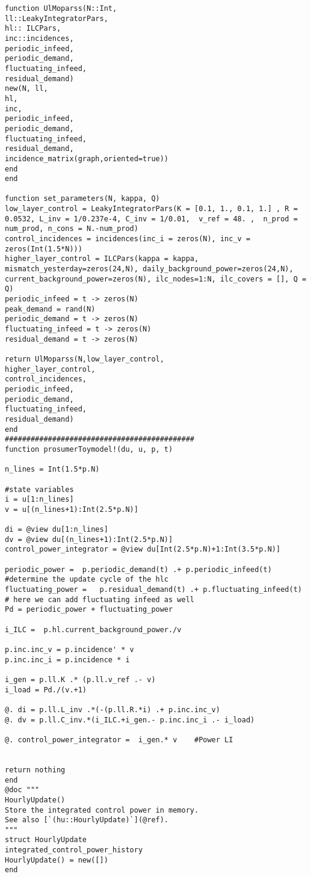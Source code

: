 \begin{lstlisting}
function UlMoparss(N::Int,
ll::LeakyIntegratorPars,
hl:: ILCPars,
inc::incidences,
periodic_infeed,
periodic_demand,
fluctuating_infeed,
residual_demand)
new(N, ll,
hl,
inc,
periodic_infeed,
periodic_demand,
fluctuating_infeed,
residual_demand,
incidence_matrix(graph,oriented=true))
end
end

function set_parameters(N, kappa, Q)
low_layer_control = LeakyIntegratorPars(K = [0.1, 1., 0.1, 1.] , R = 0.0532, L_inv = 1/0.237e-4, C_inv = 1/0.01,  v_ref = 48. ,  n_prod = num_prod, n_cons = N.-num_prod)
control_incidences = incidences(inc_i = zeros(N), inc_v = zeros(Int(1.5*N)))
higher_layer_control = ILCPars(kappa = kappa, mismatch_yesterday=zeros(24,N), daily_background_power=zeros(24,N), current_background_power=zeros(N), ilc_nodes=1:N, ilc_covers = [], Q = Q)
periodic_infeed = t -> zeros(N)
peak_demand = rand(N)
periodic_demand = t -> zeros(N)
fluctuating_infeed = t -> zeros(N)
residual_demand = t -> zeros(N)

return UlMoparss(N,low_layer_control,
higher_layer_control,
control_incidences,
periodic_infeed,
periodic_demand,
fluctuating_infeed,
residual_demand)
end
############################################
function prosumerToymodel!(du, u, p, t)

n_lines = Int(1.5*p.N)

#state variables
i = u[1:n_lines]
v = u[(n_lines+1):Int(2.5*p.N)]

di = @view du[1:n_lines]
dv = @view du[(n_lines+1):Int(2.5*p.N)]
control_power_integrator = @view du[Int(2.5*p.N)+1:Int(3.5*p.N)]

periodic_power =  p.periodic_demand(t) .+ p.periodic_infeed(t) #determine the update cycle of the hlc
fluctuating_power =   p.residual_demand(t) .+ p.fluctuating_infeed(t) # here we can add fluctuating infeed as well
Pd = periodic_power + fluctuating_power

i_ILC =  p.hl.current_background_power./v

p.inc.inc_v = p.incidence' * v
p.inc.inc_i = p.incidence * i

i_gen = p.ll.K .* (p.ll.v_ref .- v)
i_load = Pd./(v.+1)

@. di = p.ll.L_inv .*(-(p.ll.R.*i) .+ p.inc.inc_v)
@. dv = p.ll.C_inv.*(i_ILC.+i_gen.- p.inc.inc_i .- i_load)

@. control_power_integrator =  i_gen.* v 	#Power LI


return nothing
end
@doc """
HourlyUpdate()
Store the integrated control power in memory.
See also [`(hu::HourlyUpdate)`](@ref).
"""
struct HourlyUpdate
integrated_control_power_history
HourlyUpdate() = new([])
end




\end{lstlisting}
